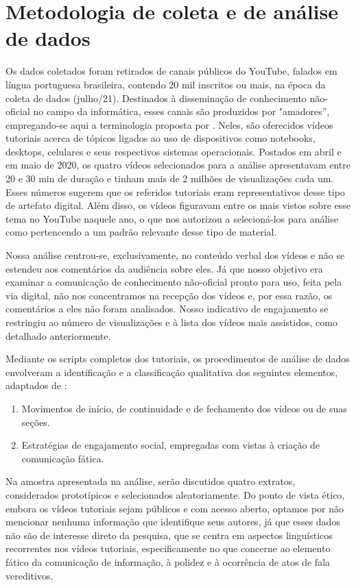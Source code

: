 \documentclass[portuguese]{textolivre}
\begin{document}
\section{Metodologia de coleta e de análise de dados}\label{sec-modelo}

Os dados coletados foram retirados de canais públicos do YouTube, falados em língua portuguesa brasileira, contendo 20 mil inscritos ou mais, na época da coleta de dados (julho/21). Destinados à disseminação de conhecimento não-oficial no campo da informática, esses canais são produzidos por "amadores'', empregando-se aqui a terminologia proposta por \textcite{tarquini2019}. Neles, são oferecidos vídeos tutoriais acerca de tópicos ligados ao uso de dispositivos como notebooks, desktops, celulares e seus respectivos sistemas operacionais. Postados em abril e em maio de 2020, os quatro vídeos selecionados para a análise apresentavam entre 20 e 30 min de duração e tinham mais de 2 milhões de visualizações cada um. Esses números sugerem que os referidos tutoriais eram representativos desse tipo de artefato digital. Além disso, os vídeos figuravam entre os mais vistos sobre esse tema no YouTube naquele ano, o que nos autorizou a selecioná-los para análise como pertencendo a um padrão relevante desse tipo de material. 

Nossa análise centrou-se, exclusivamente, no conteúdo verbal dos vídeos e não se estendeu aos comentários da audiência sobre eles. Já que nosso objetivo era examinar a comunicação de conhecimento não-oficial pronto para uso, feita pela via digital, não nos concentramos na recepção dos vídeos e, por essa razão, os comentários a eles não foram analisados. Nosso indicativo de engajamento se restringiu ao número de visualizações e à lista dos vídeos mais assistidos, como detalhado anteriormente. 

Mediante os scripts completos dos tutoriais, os procedimentos de análise de dados envolveram a identificação e a classificação qualitativa dos seguintes elementos, adaptados de \textcite{hazaparu2015}: 

\begin{enumerate}
    \item Movimentos de início, de continuidade e de fechamento dos vídeos ou de suas seções.
    \item Estratégias de engajamento social, empregadas com vistas à criação de comunicação fática.
\end{enumerate}

Na amostra apresentada na análise, serão discutidos quatro extratos, considerados prototípicos e selecionados aleatoriamente.
Do ponto de vista ético, embora os vídeos tutoriais sejam públicos e com acesso aberto, optamos por não mencionar nenhuma informação que identifique seus autores, já que esses dados não são de interesse direto da pesquisa, que se centra em aspectos linguísticos recorrentes nos vídeos tutoriais, especificamente no que concerne ao elemento fático da comunicação de informação, à polidez e à ocorrência de atos de fala vereditivos. 
\end{document}

